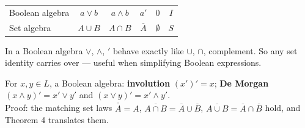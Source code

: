 \documentclass{fkt-notes}
\theoremstyle{definition}
\begin{document}
\begin{rulebox}[title={6.4 Theorem 4: Boolean algebra $\leftrightarrow$ set algebra}]
  \centering
  \begin{tabular}{@{}lccccc@{}}
    Boolean algebra & $a\vee b$ & $a\wedge b$ & $a'$          & $0$         & $I$ \\
    Set algebra     & $A\cup B$ & $A\cap B$   & $\overline A$ & $\emptyset$ & $S$
  \end{tabular}

  \smallskip
  \raggedright
  In a Boolean algebra $\vee$, $\wedge$, $'$ behave exactly like $\cup$,
  $\cap$, complement. So any set identity carries over --- useful when
  simplifying Boolean expressions.
\end{rulebox}

\begin{example}[6.4 Ex.~6]
  For $x,y\in L$, a Boolean algebra:\quad
  \textbf{involution} $(x')'=x$;\quad
  \textbf{De Morgan} $(x\wedge y)'=x'\vee y'$ and $(x\vee y)'=x'\wedge y'$.\\
  Proof: the matching set laws $\overline{\overline A}=A$,
  $\overline{A\cap B}=\overline A\cup\overline B$,
  $\overline{A\cup B}=\overline A\cap\overline B$ hold, and Theorem 4
  translates them.
\end{example}
\end{document}
